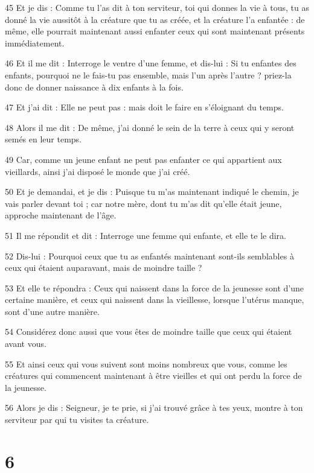 \par 45 Et je dis : Comme tu l'as dit à ton serviteur, toi qui donnes la vie à tous, tu as donné la vie aussitôt à la créature que tu as créée, et la créature l'a enfantée : de même, elle pourrait maintenant aussi enfanter ceux qui sont maintenant présents immédiatement.
\par 46 Et il me dit : Interroge le ventre d'une femme, et dis-lui : Si tu enfantes des enfants, pourquoi ne le fais-tu pas ensemble, mais l'un après l'autre ? priez-la donc de donner naissance à dix enfants à la fois.
\par 47 Et j'ai dit : Elle ne peut pas : mais doit le faire en s'éloignant du temps.
\par 48 Alors il me dit : De même, j'ai donné le sein de la terre à ceux qui y seront semés en leur temps.
\par 49 Car, comme un jeune enfant ne peut pas enfanter ce qui appartient aux vieillards, ainsi j'ai disposé le monde que j'ai créé.
\par 50 Et je demandai, et je dis : Puisque tu m'as maintenant indiqué le chemin, je vais parler devant toi ; car notre mère, dont tu m'as dit qu'elle était jeune, approche maintenant de l'âge.
\par 51 Il me répondit et dit : Interroge une femme qui enfante, et elle te le dira.
\par 52 Dis-lui : Pourquoi ceux que tu as enfantés maintenant sont-ils semblables à ceux qui étaient auparavant, mais de moindre taille ?
\par 53 Et elle te répondra : Ceux qui naissent dans la force de la jeunesse sont d'une certaine manière, et ceux qui naissent dans la vieillesse, lorsque l'utérus manque, sont d'une autre manière.
\par 54 Considérez donc aussi que vous êtes de moindre taille que ceux qui étaient avant vous.
\par 55 Et ainsi ceux qui vous suivent sont moins nombreux que vous, comme les créatures qui commencent maintenant à être vieilles et qui ont perdu la force de la jeunesse.
\par 56 Alors je dis : Seigneur, je te prie, si j'ai trouvé grâce à tes yeux, montre à ton serviteur par qui tu visites ta créature.

\chapter{6}

